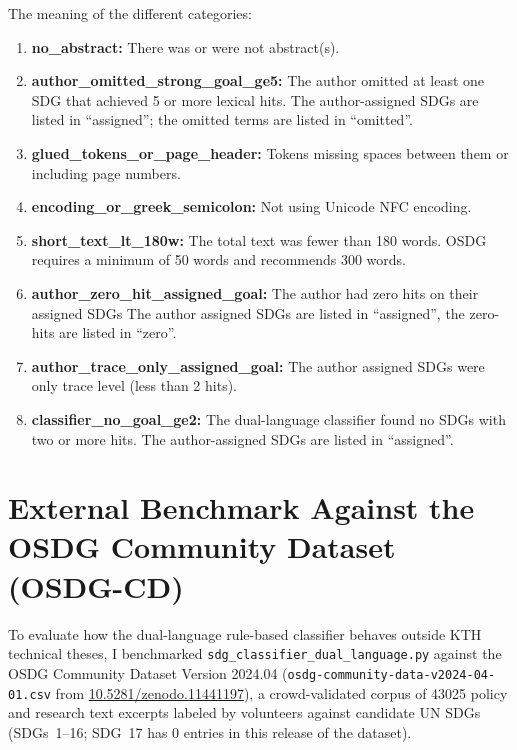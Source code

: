 The meaning of the different categories:
\begin{enumerate}
\item \textbf{no\_abstract:} There was or were not abstract(s).

\item \textbf{author\_omitted\_strong\_goal\_ge5:} The author omitted at least one \gls{SDG} that achieved \num{5} or more lexical hits. The author-assigned \glspl{SDG} are listed in \enquote{assigned}; the omitted terms are listed in \enquote{omitted}.

\item \textbf{glued\_tokens\_or\_page\_header:} Tokens missing spaces between them or including page numbers.

\item \textbf{encoding\_or\_greek\_semicolon:} Not using Unicode NFC encoding.

\item \textbf{short\_text\_lt\_180w:} The total text was fewer than 180 words. OSDG requires a minimum of 50 words and recommends 300 words.

\item \textbf{author\_zero\_hit\_assigned\_goal:} The author had zero hits on their assigned \glspl{SDG} The author assigned \glspl{SDG} are listed in \enquote{assigned}, the zero-hits are listed in \enquote{zero}.

\item \textbf{author\_trace\_only\_assigned\_goal:} The author assigned \glspl{SDG} were only trace level (\ie less than 2 hits).

\item \textbf{classifier\_no\_goal\_ge2:} The dual-language classifier found no \glspl{SDG} with two or more hits. The author-assigned \glspl{SDG} are listed in \enquote{assigned}.
\end{enumerate}
\clearpage

\section{External Benchmark Against the OSDG Community Dataset (OSDG-CD)}
\label{appendix:OSDG_CD_Benchmark}

To evaluate how the dual-language rule-based classifier behaves outside KTH technical theses, I benchmarked \texttt{sdg\_classifier\_dual\_language.py} against the OSDG Community Dataset Version 2024.04 (\texttt{osdg-community-data-v2024-04-01.csv} from 
\href{https://zenodo.org/records/11441197}{10.5281/zenodo.11441197}), a crowd-validated corpus of \num{43025} policy and research text excerpts labeled by volunteers against candidate \gls{UN} \glspl{SDG} (\glspl{SDG}~1--16; \gls{SDG}~17 has \num{0} entries in this release of the dataset).

